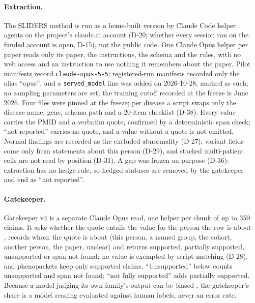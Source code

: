 \documentclass{article} %
\begin{document}
\paragraph{Extraction.} The SLIDERS method \citep{joshi2026_sliders} is run as a home-built version by Claude Code helper agents on the project's claude.ai account (D-20; whether every session ran on the funded account is open, D-15), not the public code. One Claude Opus helper per paper reads only its paper, the instructions, the schema and the rules, with no web access and an instruction to use nothing it remembers about the paper. Pilot manifests record \texttt{claude-opus-5-5}; registered-run manifests recorded only the alias ``opus'', and a \texttt{served\_model} line was added on 2026-10-28, marked as such; no sampling parameters are set; the training cutoff recorded at the freeze is June 2026. Four files were pinned at the freeze; per disease a script swaps only the disease name, gene, schema path and a 20-item checklist (D-38). Every value carries the PMID and a verbatim quote, confirmed by a deterministic span check; ``not reported'' carries no quote, and a value without a quote is not emitted. Normal findings are recorded as the excluded abnormality (D-27), variant fields come only from statements about this person (D-29), and stacked multi-patient cells are not read by position (D-31). A gap was frozen on purpose (D-36): extraction has no hedge rule, so hedged statuses are removed by the gatekeeper and end as ``not reported''.

\paragraph{Gatekeeper.} Gatekeeper v4 is a separate Claude Opus read, one helper per chunk of up to 350 claims. It asks whether the quote entails the value for the person the row is about \citep{rashkin2023_ais}, records whom the quote is about (this person, a named group, the cohort, another person, the paper, unclear) and returns supported, partially supported, unsupported or span not found; no value is exempted by script matching (D-28), and phenopackets keep only supported claims. ``Unsupported'' below counts unsupported and span not found; ``not fully supported'' adds partially supported. Because a model judging its own family's output can be biased \citep{zheng2023_llm_judge}, the gatekeeper's share is a model reading evaluated against human labels, never an error rate.
\end{document}
